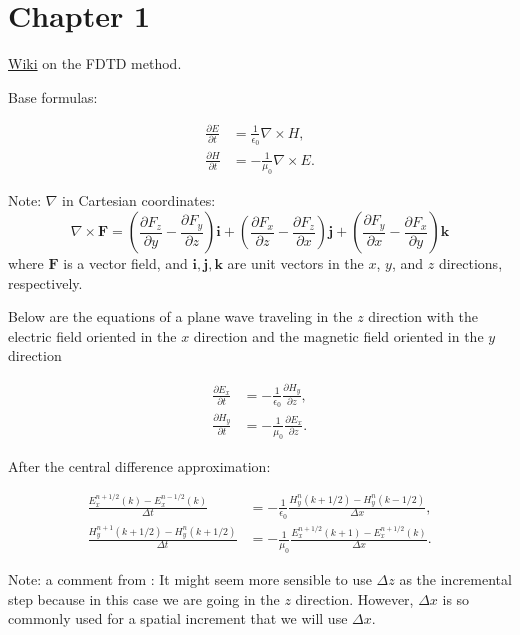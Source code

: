 
\section{Chapter 1}

\href{https://en.wikipedia.org/wiki/Finite-difference_time-domain_method}{Wiki} on the FDTD method.

Base formulas:

\[
\begin{aligned}
  \frac{\partial E}{\partial t} &= \frac{1}{\epsilon_0} \nabla \times H, \\
  \frac{\partial H}{\partial t} &= -\frac{1}{\mu_0} \nabla \times E.
\end{aligned}
\]


Note: $\nabla$ in Cartesian coordinates:
\[
\nabla \times \mathbf{F} = \left( \frac{\partial F_z}{\partial y} - \frac{\partial F_y}{\partial
z} \right) \mathbf{i}
+ \left( \frac{\partial F_x}{\partial z} - \frac{\partial F_z}{\partial x} \right) \mathbf{j}
+ \left( \frac{\partial F_y}{\partial x} - \frac{\partial F_x}{\partial y} \right) \mathbf{k}
\]
where \(\mathbf{F}\) is a vector field, and \(\mathbf{i}, \mathbf{j}, \mathbf{k}\) are unit
vectors in the \(x\), \(y\), and \(z\) directions, respectively.

\vsp

Below are the equations of a plane wave traveling in the $z$ direction with the
electric field oriented in the $x$ direction and the magnetic field oriented in the
$y$ direction

\[
\begin{aligned}
\frac{\partial E_x}{\partial t} &= -\frac{1}{\epsilon_0} \frac{\partial H_y}{\partial z}, \\
\frac{\partial H_y}{\partial t} &= -\frac{1}{\mu_0} \frac{\partial E_x}{\partial z}.
\end{aligned}
\]

After the central difference approximation:

\[
\begin{aligned}
\frac{E_x^{n + 1/2}(k) - E_x^{n - 1/2}(k)}{\Delta t} &= -\frac{1}{\epsilon_0} \frac{H_y^n(k + 1/2) - H_y^n(k - 1/2)}{\Delta x}, \\
\frac{H_y^{n + 1}(k + 1/2) - H_y^n(k + 1/2)}{\Delta t} &= -\frac{1}{\mu_0} \frac{E_x^{n + 1/2}(k + 1) - E_x^{n + 1/2}(k)}{\Delta x}.
\end{aligned}
\]

Note: a comment from \cite{houle2019fdtd}: It might seem more sensible to use $\Delta{z}$ as the
incremental step because in this case we are going in the $z$ direction. However, $\Delta{x}$ is so
commonly used for a spatial increment that we will use $\Delta{x}$.

